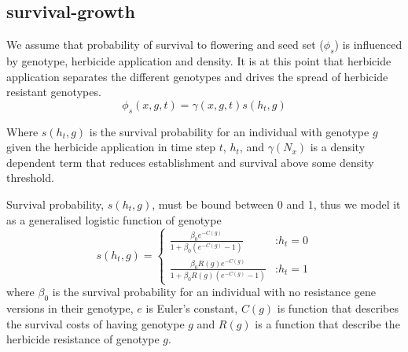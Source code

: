 \documentclass[12pt, a4paper]{article}
\begin{document}
\subsection*{survival-growth}
We assume that probability of survival to flowering and seed set ($\phi_s$) is influenced by genotype, herbicide application and density. It is at this point that herbicide application separates the different genotypes and drives the spread of herbicide resistant genotypes.     
\begin{equation}\label{eq:survival}
	\phi_s(x, g, t) = \gamma(x, g, t)s(h_t, g) 
\end{equation}

Where $s(h_t, g)$ is the survival probability for an individual with genotype $g$ given the herbicide application in time step $t$, $h_t$, and $\gamma(N_x)$ is a density dependent term that reduces establishment and survival above some density threshold.  

Survival probability, $s(h_t, g)$, must be bound between 0 and 1, thus we model it as a generalised logistic function of genotype     
\begin{equation}\label{eq:herb_surv}
	s(h_t, g) =	\begin{cases}
		\frac{\beta_0 e^{-C(g)}}{1 + \beta_0 (e^{-C(g)} - 1)} &\text{:} h_t = 0 \\
		\frac{\beta_0 R(g) e^{-C(g)}}{1 + \beta_0 R(g) (e^{-C(g)} - 1)} &\text{:} h_t = 1
	\end{cases}	
\end{equation}
where $\beta_0$ is the survival probability for an individual with no resistance gene versions in their genotype, $e$ is Euler's constant, $C(g)$ is function that describes the survival costs of having genotype $g$ and $R(g)$ is a function that describe the herbicide resistance of genotype $g$.
\end{document}
